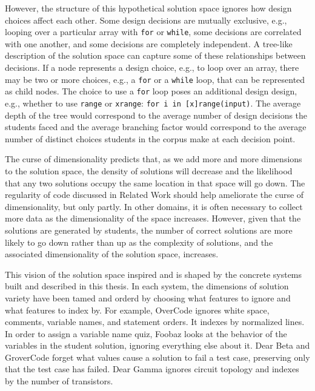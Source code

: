 However, the structure of this hypothetical solution space ignores how design choices affect each other. Some design decisions are mutually exclusive, e.g., looping over a particular array with \texttt{for} or \texttt{while}, some decisions are correlated with one another, and some decisions are completely independent. A tree-like description of the solution space can capture some of these relationships between decisions. If a node represents a design choice, e.g., to loop over an array, there may be two or more choices, e.g., a \texttt{for} or a \texttt{while} loop, that can be represented as child nodes. The choice to use a \texttt{for} loop poses an additional design design, e.g., whether to use \texttt{range} or \texttt{xrange}: \texttt{for i in [x]range(input)}. The average depth of the tree would correspond to the average number of design decisions the students faced and the average branching factor would correspond to the average number of distinct choices students in the corpus make at each decision point.

The curse of dimensionality predicts that, as we add more and more dimensions to the solution space, the density of solutions will decrease and the likelihood that any two solutions occupy the same location in that space will go down. The regularity of code discussed in Related Work should help ameliorate the curse of dimensionality, but only partly. In other domains, it is often necessary to collect more data as the dimensionality of the space increases. However, given that the solutions are generated by students, the number of correct solutions are more likely to go down rather than up as the complexity of solutions, and the associated dimensionality of the solution space, increases.

This vision of the solution space inspired and is shaped by the concrete systems built and described in this thesis. In each system, the dimensions of solution variety have been tamed and orderd by choosing what features to ignore and what features to index by. For example, OverCode ignores white space, comments, variable names, and statement orders. It indexes by normalized lines. In order to assign a variable name quiz, Foobaz looks at the behavior of the variables in the student solution, ignoring everything else about it. Dear Beta and GroverCode forget what values cause a solution to fail a test case, preserving only that the test case has failed. Dear Gamma ignores circuit topology and indexes by the number of transistors.


